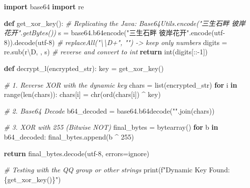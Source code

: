 \documentclass[
]{article}
\newenvironment{Shaded}{}{}
\newcommand{\BuiltInTok}[1]{\textcolor[rgb]{0.00,0.50,0.00}{#1}}
\newcommand{\CommentTok}[1]{\textcolor[rgb]{0.38,0.63,0.69}{\textit{#1}}}
\newcommand{\ControlFlowTok}[1]{\textcolor[rgb]{0.00,0.44,0.13}{\textbf{#1}}}
\newcommand{\DecValTok}[1]{\textcolor[rgb]{0.25,0.63,0.44}{#1}}
\newcommand{\ImportTok}[1]{\textcolor[rgb]{0.00,0.50,0.00}{\textbf{#1}}}
\newcommand{\KeywordTok}[1]{\textcolor[rgb]{0.00,0.44,0.13}{\textbf{#1}}}
\newcommand{\NormalTok}[1]{#1}
\newcommand{\OperatorTok}[1]{\textcolor[rgb]{0.40,0.40,0.40}{#1}}
\newcommand{\SpecialCharTok}[1]{\textcolor[rgb]{0.25,0.44,0.63}{#1}}
\newcommand{\SpecialStringTok}[1]{\textcolor[rgb]{0.73,0.40,0.53}{#1}}
\newcommand{\StringTok}[1]{\textcolor[rgb]{0.25,0.44,0.63}{#1}}
\newcommand{\VerbatimStringTok}[1]{\textcolor[rgb]{0.25,0.44,0.63}{#1}}
\begin{document}
\begin{Shaded}
\begin{Highlighting}[]
\ImportTok{import}\NormalTok{ base64}
\ImportTok{import}\NormalTok{ re}

\KeywordTok{def}\NormalTok{ get\_xor\_key():}
    \CommentTok{\# Replicating the Java: Base64Utils.encode("三生石畔 彼岸花开".getBytes())}
\NormalTok{    s }\OperatorTok{=}\NormalTok{ base64.b64encode(}\StringTok{"三生石畔 彼岸花开"}\NormalTok{.encode(}\StringTok{\textquotesingle{}utf{-}8\textquotesingle{}}\NormalTok{)).decode(}\StringTok{\textquotesingle{}utf{-}8\textquotesingle{}}\NormalTok{)}
    \CommentTok{\# replaceAll("\textbackslash{}\textbackslash{}D+", "") {-}\textgreater{} keep only numbers}
\NormalTok{    digits }\OperatorTok{=}\NormalTok{ re.sub(}\VerbatimStringTok{r\textquotesingle{}}\DecValTok{\textbackslash{}D}\VerbatimStringTok{\textquotesingle{}}\NormalTok{, }\StringTok{\textquotesingle{}\textquotesingle{}}\NormalTok{, s)}
    \CommentTok{\# reverse and convert to int}
    \ControlFlowTok{return} \BuiltInTok{int}\NormalTok{(digits[::}\OperatorTok{{-}}\DecValTok{1}\NormalTok{])}

\KeywordTok{def}\NormalTok{ decrypt\_l(encrypted\_str):}
\NormalTok{    key }\OperatorTok{=}\NormalTok{ get\_xor\_key()}

    \CommentTok{\# 1. Reverse XOR with the dynamic key}
\NormalTok{    chars }\OperatorTok{=} \BuiltInTok{list}\NormalTok{(encrypted\_str)}
    \ControlFlowTok{for}\NormalTok{ i }\KeywordTok{in} \BuiltInTok{range}\NormalTok{(}\BuiltInTok{len}\NormalTok{(chars)):}
\NormalTok{        chars[i] }\OperatorTok{=} \BuiltInTok{chr}\NormalTok{(}\BuiltInTok{ord}\NormalTok{(chars[i]) }\OperatorTok{\^{}}\NormalTok{ key)}

    \CommentTok{\# 2. Base64 Decode}
\NormalTok{    b64\_decoded }\OperatorTok{=}\NormalTok{ base64.b64decode(}\StringTok{""}\NormalTok{.join(chars))}

    \CommentTok{\# 3. XOR with 255 (Bitwise NOT)}
\NormalTok{    final\_bytes }\OperatorTok{=} \BuiltInTok{bytearray}\NormalTok{()}
    \ControlFlowTok{for}\NormalTok{ b }\KeywordTok{in}\NormalTok{ b64\_decoded:}
\NormalTok{        final\_bytes.append(b }\OperatorTok{\^{}} \DecValTok{255}\NormalTok{)}

    \ControlFlowTok{return}\NormalTok{ final\_bytes.decode(}\StringTok{\textquotesingle{}utf{-}8\textquotesingle{}}\NormalTok{, errors}\OperatorTok{=}\StringTok{\textquotesingle{}ignore\textquotesingle{}}\NormalTok{)}

\CommentTok{\# Testing with the QQ group or other strings}
\BuiltInTok{print}\NormalTok{(}\SpecialStringTok{f"Dynamic Key Found: }\SpecialCharTok{\{}\NormalTok{get\_xor\_key()}\SpecialCharTok{\}}\SpecialStringTok{"}\NormalTok{)}
\end{Highlighting}
\end{Shaded}
\end{document}
